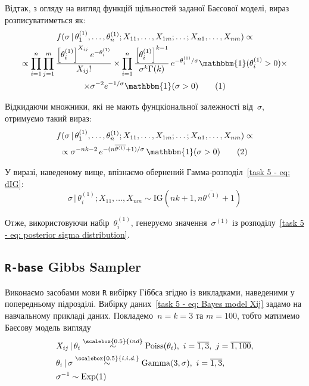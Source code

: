 \begin{enumerate}
        Відтак, з огляду на вигляд функцій щільностей заданої Баєсової моделі, вираз розписуватиметься як:
        \begin{multline*}
            f(\sigma \,|\, \theta_1^{(1)},\ldots,\theta_n^{(1)}; X_{11},\ldots,X_{1m};\ldots;X_{n1},\ldots,X_{nm}) \propto \\
            \propto \prod_{i=1}^{n} \prod_{j=1}^{m} \frac{\left[ \theta_i^{(1)} \right]^{X_{ij}} e^{-\theta_i^{(1)}}}{X_{ij}!} \times \prod_{i=1}^{n} \frac{\left[ \theta_i^{(1)} \right]^{k-1}}{\sigma^{k}\Gamma(k)}\, e^{-\theta_i^{(1)}/\sigma} \mathbbm{1}(\theta_i^{(1)}>0) \times \\ 
            \times \sigma^{-2}e^{-1/\sigma} \mathbbm{1}(\sigma>0) \stepcounter{equation}\tag{\theequation}
        \end{multline*}
       
        Відкидаючи множники, які не мають фунцкіональної залежності від~$\sigma$, отримуємо такий вираз:
        \begin{multline*}
            f(\sigma \,|\, \theta_1^{(1)},\ldots,\theta_n^{(1)}; X_{11},\ldots,X_{1m};\ldots;X_{n1},\ldots,X_{nm}) \propto \\
            \propto \sigma^{-nk-2}\, e^{-(n\overline{\theta^{(1)}} + 1)/\sigma}\, \mathbbm{1}(\sigma>0) \stepcounter{equation}\tag{\theequation}
        \end{multline*}

        У виразі, наведеному вище, впізнаємо обернений Гамма-розподіл~\eqref{task 5 - eq: dIG}:
        \begin{equation}\label{task 5 - eq: posterior sigma distribution}
            \sigma \,|\, \theta_i^{(1)}; X_{11},\ldots,X_{nm} \sim \mathrm{IG}\left( nk+1, n\overline{\theta^{(1)}} + 1 \right)
        \end{equation}

        Отже, використовуючи набір~$\theta_i^{(1)}$, генеруємо значення~$\sigma^{(1)}$ із розподілу~\eqref{task 5 - eq: posterior sigma distribution}.
\end{enumerate}

\subsection{\texttt{R-base} Gibbs Sampler}

Виконаємо засобами мови \texttt{R} вибірку Гіббса згідно із викладками, наведеними у попередньому підрозділі. Вибірку даних~\eqref{task 5 - eq: Bayes model Xij} задамо на навчальному прикладі даних. Покладемо~$n=k=3$ та $m=100$, тобто матимемо Баєсову модель вигляду
\begin{align}
    & X_{ij} \,|\, \theta_i \overset{\scalebox{0.5}{ind}}{\sim} \mathrm{Poiss}(\theta_i),\ i=\overline{1,3},\ j=\overline{1,100}, \\
    & \theta_i \,|\, \sigma \overset{\scalebox{0.5}{i.i.d.}}{\sim} \mathrm{Gamma}(3,\sigma),\ i=\overline{1,3}, \\
    & \sigma^{-1} \sim \mathrm{Exp}(1)
\end{align}

